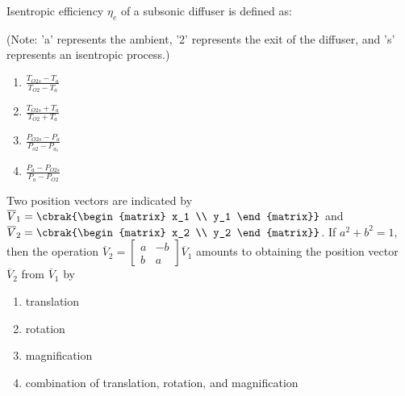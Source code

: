  \iffalse
        \chapter{2010}
        \author{AI24BTECH11034}
        \section{ae}
 \fi
\item  Isentropic efficiency $\eta_e$ of a subsonic diffuser is defined as:

(Note: 'a' represents the ambient, '2' represents the exit of the diffuser, and 's' represents an isentropic process.)

\begin{multicols}{4}
\begin{enumerate}
    \item $\frac{T_{O2s}-T_{a}}{T_{O2}-T_{a}}$
    \item $\frac{T_{O2s}+T_{a}}{T_{O2}+T_{a}}$
    \item $\frac{P_{O2s}-P_{a}}{P_{o2}-P_{a_s}}$
    \item $\frac{P_{a}-P_{O2s}}{P_{a}-P_{O2}}$
\end{enumerate}
\end{multicols}

\item Two position vectors are indicated by $\overline{V}_1 = \cbrak{\begin{matrix} x_1 \\ y_1 \end{matrix}}$ and $\overline{V}_2 = \cbrak{\begin{matrix} x_2 \\ y_2 \end{matrix}}$. If $a^2 + b^2 = 1$, then the operation $\overline{V}_2 = \begin{bmatrix} a & -b \\ b & a \end{bmatrix} \overline{V}_1$
   amounts to obtaining the position vector $\overline{V}_2$ from $\overline{V}_1$ by

\begin{enumerate}
    \item translation
    \item rotation
    \item magnification
    \item combination of translation, rotation, and magnification
\end{enumerate}

